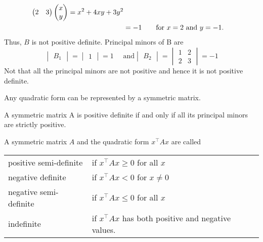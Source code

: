 \documentclass[12pt,class=book,crop=false]{standalone}
\begin{document}
\begin{ex}
\begin{align*}
\begin{pmatrix*}[r]
            2 & 3
        \end{pmatrix*}\begin{pmatrix}
            x \\
            y
        \end{pmatrix}= x^2+4xy+3y^2 \\
                  & = -1\qquad\text{for $ x=2 $ and $ y=-1 $.}
    \end{align*}
    Thus, $ B $ is not positive definite.
    Principal minors of B are
    \[
        \begin{vmatrix}
            B_1
        \end{vmatrix}=\begin{vmatrix}
            1
        \end{vmatrix}=1 \quad \text{ and} \begin{vmatrix}
            B_2
        \end{vmatrix}=\begin{vmatrix}
            1 & 2 \\
            2 & 3
        \end{vmatrix}=-1
    \]
    Not that all the principal minors are not positive and hence it is not positive definite.
\end{ex}
\begin{rem}
    Any quadratic form can be represented by a symmetric matrix.
\end{rem}
\begin{thm}
    A symmetric matrix A is positive definite if and only if all its principal minors are strictly positive.
\end{thm}
\begin{defn}
    A symmetric matrix $ A $ and the quadratic form $ x^\top Ax $ are called
    \begin{table}[H]
        \begin{tabular}{ll}
            positive semi-definite & if $ x^\top Ax\geq 0 $ for all $ x $                    \\
            negative definite      & if  $ x^\top Ax <0 $  for $ {x}\neq{0} $                \\
            negative semi-definite & if $ x^\top Ax\leq0 $ for all $ x $                     \\
            indefinite             & if $ x^\top Ax $ has both positive and negative values.
        \end{tabular}
    \end{table}
\end{defn}
\end{document}
